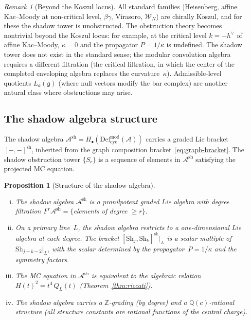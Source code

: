 \documentclass[11pt,reqno]{amsart}
\newtheorem{proposition}[theorem]{Proposition}
\theoremstyle{definition}
\theoremstyle{remark}
\newtheorem{remark}[theorem]{Remark}
\newcommand{\cA}{\mathcal{A}}
\newcommand{\cW}{\mathcal{W}}
\newcommand{\Defcyc}{\mathrm{Def}_{\mathrm{cyc}}}
\newcommand{\Sh}{\mathrm{Sh}}
\newcommand{\fg}{\mathfrak{g}}
\numberwithin{equation}{section}
\begin{document}
\begin{remark}[Beyond the Koszul
locus]\label{rem:beyond-koszul}
All standard families (Heisenberg, affine Kac--Moody at
non-critical level, $\beta\gamma$, Virasoro, $\cW_N$) are
chirally Koszul, and for these the shadow tower is
unobstructed. The obstruction theory becomes nontrivial
beyond the Koszul locus: for example, at the critical level
$k = -h^\vee$ of affine Kac--Moody, $\kappa = 0$ and the
propagator $P = 1/\kappa$ is undefined. The shadow tower
does not exist in the standard sense; the modular
convolution algebra requires a different filtration (the
critical filtration, in which the center of the completed
enveloping algebra replaces the curvature~$\kappa$).
Admissible-level quotients $L_k(\fg)$ (where null vectors
modify the bar complex) are another natural class where
obstructions may arise.
\end{remark}


\subsection{The shadow algebra
structure}\label{subsec:shadow-algebra}

The shadow algebra
$\cA^{\mathrm{sh}} = H_\bullet(
\Defcyc^{\mathrm{mod}}(\cA))$ carries a graded Lie
bracket $[-,-]^{\mathrm{sh}}$, inherited from the graph
composition bracket~\eqref{eq:graph-bracket}. The shadow
obstruction tower $\{S_r\}$ is a sequence of elements in
$\cA^{\mathrm{sh}}$ satisfying the projected MC equation.

\begin{proposition}[Structure of the shadow
algebra]\label{prop:shadow-algebra}
\leavevmode
\begin{enumerate}[(i)]
\item The shadow algebra $\cA^{\mathrm{sh}}$ is a
 pronilpotent graded Lie algebra with degree filtration
 $F^r \cA^{\mathrm{sh}} = \{$elements of degree
 $\ge r\}$.

\item On a primary line~$L$, the shadow algebra restricts
 to a one-dimensional Lie algebra at each degree. The
 bracket $[\Sh_j, \Sh_k]^{\mathrm{sh}}|_L$ is a scalar
 multiple of $\Sh_{j+k-2}|_L$, with the scalar determined
 by the propagator~$P = 1/\kappa$ and the symmetry
 factors.

\item The MC equation in $\cA^{\mathrm{sh}}$ is equivalent
 to the algebraic relation $H(t)^2 = t^4\, Q_L(t)$
 (Theorem~\ref{thm:riccati}).

\item The shadow algebra carries a $\mathbb{Z}$-grading
 (by degree) and a $\mathbb{Q}(c)$-rational structure
 (all structure constants are rational functions of the
 central charge).
\end{enumerate}
\end{proposition}
\end{document}
